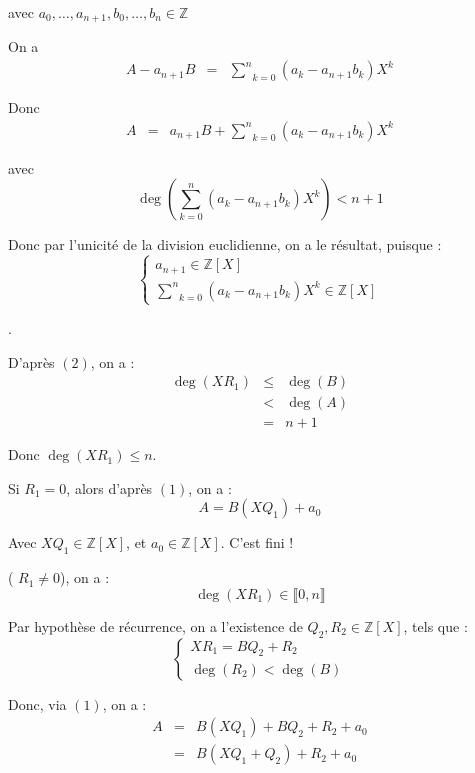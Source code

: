 avec $a_0, \ldots, a_{n + 1}, b_0, \ldots, b_n \in \mathbb{Z}$

On a
\begin{eqnarray*}
  A - a_{n + 1} B & = & \underset{k = 0}{\overset{n}{\sum}} (a_k - a_{n + 1}
  b_k) X^k
\end{eqnarray*}


Donc
\[ \begin{array}{lll}
     A & = & a_{n + 1} B + \underset{k = 0}{\overset{n}{\sum}} (a_k - a_{n +
     1} b_k) X^k
   \end{array} \]


avec
\[ \deg \left( \underset{k = 0}{\overset{n}{\sum}} (a_k - a_{n + 1} b_k) X^k
   \right) < n + 1 \]


Donc par l'unicit{\'e} de la division euclidienne, on a le r{\'e}sultat,
puisque :
\[ \left\{\begin{array}{l}
     a_{n + 1} \in \mathbb{Z} [X]\\
     \underset{k = 0}{\overset{n}{\sum}} (a_k - a_{n + 1} b_k) X^k \in
     \mathbb{Z} [X]
   \end{array}\right. \]


.

D'apr{\`e}s $(2)$, on a :
\begin{eqnarray*}
  \deg (X R_1) & \leqslant & \deg (B)\\
  & < & \deg (A)\\
  & = & n + 1
\end{eqnarray*}


Donc $\deg (X R_1) \leqslant n$.

Si $R_1 = 0$, alors d'apr{\`e}s $(1)$, on a :
\[ A = B (X Q_1) + a_0 \]


Avec $X Q_1 \in \mathbb{Z} [X]$, et $a_0 \in \mathbb{Z} [X]$. C'est fini !

 ( $R_1 \neq 0$), on a :
\[ \deg (X R_1) \in \llbracket 0, n \rrbracket \]


Par hypoth{\`e}se de r{\'e}currence, on a l'existence de $Q_2, R_2 \in
\mathbb{Z} [X]$, tels que :
\[ \left\{\begin{array}{l}
     X R_1 = B Q_2 + R_2\\
     \deg (R_2) < \deg (B)
   \end{array}\right. \]


Donc, via $(1)$, on a :
\begin{eqnarray*}
  A & = & B (X Q_1) + B Q_2 + R_2 + a_0\\
  & = & B (X Q_1 + Q_2) + R_2 + a_0
\end{eqnarray*}



